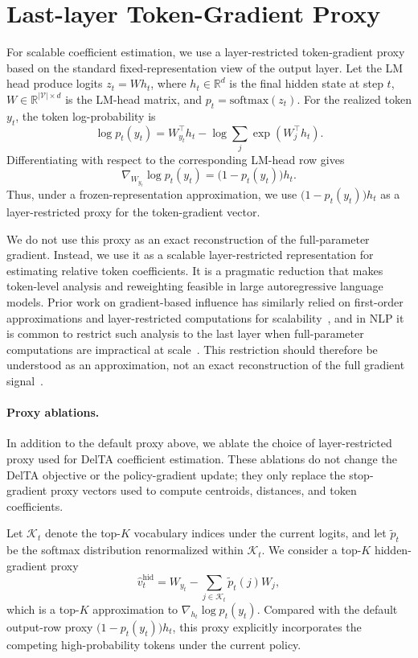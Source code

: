 \documentclass{llmxive}
\begin{document}
\section{Last-layer Token-Gradient Proxy}
\label{app:proxy}

For scalable coefficient estimation, we use a layer-restricted token-gradient proxy based on the standard fixed-representation view of the output layer. Let the LM head produce logits \(z_t = W h_t\), where \(h_t \in \mathbb{R}^d\)
is the final hidden state at step \(t\), \(W \in \mathbb{R}^{|\mathcal V|\times d}\)
is the LM-head matrix, and \(p_t=\mathrm{softmax}(z_t)\). For the realized token
\(y_t\), the token log-probability is
\[
\log p_t(y_t)
=
W_{y_t}^{\top}h_t
-
\log\sum_j \exp(W_j^{\top}h_t).
\]
Differentiating with respect to the corresponding LM-head row gives
\[
\nabla_{W_{y_t}}\log p_t(y_t)
=
\bigl(1-p_t(y_t)\bigr)h_t.
\]
Thus, under a frozen-representation approximation, we use
\(\bigl(1-p_t(y_t)\bigr)h_t\) as a layer-restricted proxy for the token-gradient
vector.

We do not use this proxy as an exact reconstruction of the full-parameter gradient.  Instead, we use it as a scalable layer-restricted representation for estimating relative token coefficients. It is a pragmatic reduction that makes token-level analysis and reweighting feasible in large autoregressive language models. Prior work on gradient-based influence has similarly relied on first-order approximations and layer-restricted computations for scalability~\citep{pruthi2020estimating}, and in NLP it is common to restrict such analysis to the last layer when
full-parameter computations are impractical at scale~\citep{yeh2022first}.
This restriction should therefore be understood as an approximation, not an
exact reconstruction of the full gradient signal~\citep{yeh2022first}.

\paragraph{Proxy ablations.}
In addition to the default proxy above, we ablate the choice of layer-restricted
proxy used for DelTA coefficient estimation. These ablations do not change the
DelTA objective or the policy-gradient update; they only replace the
stop-gradient proxy vectors used to compute centroids, distances, and token
coefficients.

Let \(\mathcal K_t\) denote the top-\(K\) vocabulary indices under the current
logits, and let \(\widetilde p_t\) be the softmax distribution renormalized
within \(\mathcal K_t\). We consider a top-\(K\) hidden-gradient proxy
\[
\widehat v^{\mathrm{hid}}_t
=
W_{y_t}
-
\sum_{j\in\mathcal K_t}
\widetilde p_t(j) W_j,
\]
which is a top-\(K\) approximation to
\(\nabla_{h_t}\log p_t(y_t)\). Compared with the default output-row proxy
\(\bigl(1-p_t(y_t)\bigr)h_t\), this proxy explicitly incorporates the competing
high-probability tokens under the current policy.
\end{document}
